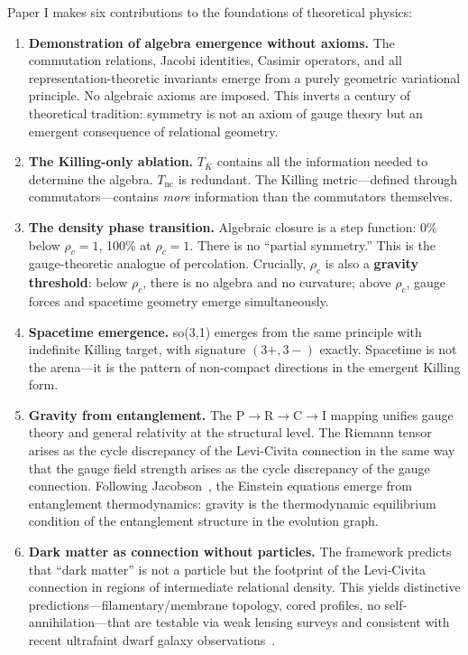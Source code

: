 Paper I makes six contributions to the foundations of theoretical physics:

\begin{enumerate}
\item \textbf{Demonstration of algebra emergence without axioms.} The commutation relations, Jacobi identities, Casimir operators, and all representation-theoretic invariants emerge from a purely geometric variational principle. No algebraic axioms are imposed. This inverts a century of theoretical tradition: symmetry is not an axiom of gauge theory but an emergent consequence of relational geometry.

\item \textbf{The Killing-only ablation.} $T_K$ contains all the information needed to determine the algebra. $T_{\mathrm{nc}}$ is redundant. The Killing metric---defined through commutators---contains \textit{more} information than the commutators themselves.

\item \textbf{The density phase transition.} Algebraic closure is a step function: 0\% below $\rho_c = 1$, 100\% at $\rho_c = 1$. There is no ``partial symmetry.'' This is the gauge-theoretic analogue of percolation. Crucially, $\rho_c$ is also a \textbf{gravity threshold}: below $\rho_c$, there is no algebra and no curvature; above $\rho_c$, gauge forces and spacetime geometry emerge simultaneously.

\item \textbf{Spacetime emergence.} so(3,1) emerges from the same principle with indefinite Killing target, with signature $(3+,3-)$ exactly. Spacetime is not the arena---it is the pattern of non-compact directions in the emergent Killing form.

\item \textbf{Gravity from entanglement.} The P$\to$R$\to$C$\to$I mapping unifies gauge theory and general relativity at the structural level. The Riemann tensor arises as the cycle discrepancy of the Levi-Civita connection in the same way that the gauge field strength arises as the cycle discrepancy of the gauge connection. Following Jacobson~\cite{Jacobson1995,Jacobson1998}, the Einstein equations emerge from entanglement thermodynamics: gravity is the thermodynamic equilibrium condition of the entanglement structure in the evolution graph.

\item \textbf{Dark matter as connection without particles.} The framework predicts that ``dark matter'' is not a particle but the footprint of the Levi-Civita connection in regions of intermediate relational density. This yields distinctive predictions---filamentary/membrane topology, cored profiles, no self-annihilation---that are testable via weak lensing surveys and consistent with recent ultrafaint dwarf galaxy observations~\cite{SanchezAlmeitaTrujilloPlastino2024}.
\end{enumerate}

